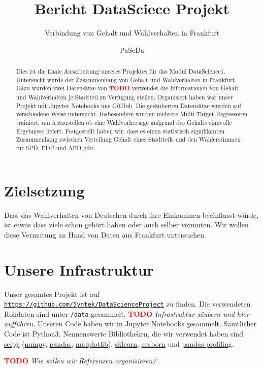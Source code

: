 \documentclass[a4paper,10pt]{scrartcl}
\title{\vspace{-2cm}Bericht DataSciece Projekt}
\subtitle{Verbindung von Gehalt und Wahlverhalten in Frankfurt}
\author{PaSeDa}
\date{}
\newcommand{\TODO}{\textcolor{red}{\textbf{TODO }}}
\begin{document}
\maketitle

\begin{abstract}Dies ist die finale Ausarbeitung unseres Projektes für das Modul DataScience1. Untersucht wurde der Zusammenhang von Gehalt und Wahlverhalten in Frankfurt. Dazu wurden zwei Datensätze  von \TODO verwendet die Informationen von Gehalt und Wahlverhalten je Stadtteil zu Verfügung stellen. Organisiert haben war unser Projekt mit Jupyter Notebooks uns GitHub. Die gesäuberten Datensätze wurden auf verschiedene Weise untersucht. Insbesondere wurden mehrere Multi-Target-Regressoren trainiert, um festzustellen ob eine Wahlvorhersage aufgrund des Gehalts sinnvolle Ergebnisse liefert. Festgestellt haben wir, dass es einen statistisch signifikanten Zusammenhang zwischen Verteilung Gehalt eines Stadtteils und den Wählerstimmen für SPD, FDP und AFD gibt.  \end{abstract}

\tableofcontents

\section{Zielsetzung}
Dass das Wahlverhalten von Deutschen durch ihre Einkommen beeinflusst würde, ist etwas dass viele schon gehört haben oder auch selber vermuten. Wir wollen diese Vermutung an Hand von Daten aus Frankfurt untersuchen.

\section{Unsere Infrastruktur}
Unser gesamtes Projekt ist auf \href{Github}{\lstinline|https://github.com/5yntek/DataScienceProject|} zu finden. Die verwendeten Rohdaten sind unter \lstinline|/data| gesammelt. \TODO \emph{Infrastruktur säubern und hier aufführen}. Unseren Code haben wir in Jupyter Notebooks gesammelt. Sämtlicher Code ist Python3. Nennenswerte Bibliotheken, die wir verwendet haben sind \href{https://www.scipy.org/}{scipy} (\href{https://numpy.org/}{numpy}, \href{https://pandas.pydata.org/}{pandas}, \href{https://matplotlib.org/}{matplotlib}), \href{https://scikit-learn.org/}{sklearn}, \href{https://seaborn.pydata.org/}{seaborn}  und \href{https://github.com/pandas-profiling/pandas-profiling}{pandas-profiling}.

\TODO \emph{Wie sollen wir Referenzen organisieren?}
\end{document}
